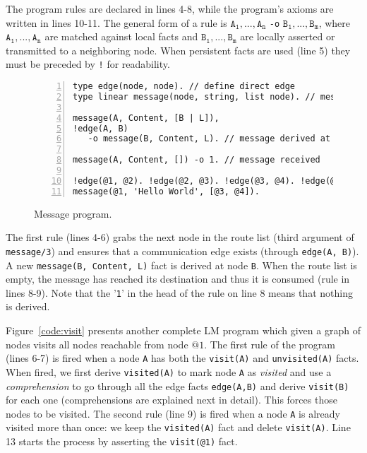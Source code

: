The program rules are declared in lines 4-8, while the program's axioms are written in lines 10-11.
The general form of a rule is $\mathtt{A_1},...,\mathtt{A_n}$ \texttt{-o} $\mathtt{B_1},...,\mathtt{B_m}$, where $\mathtt{A_1},...,\mathtt{A_n}$ are matched against local facts and $\mathtt{B_1},...,\mathtt{B_m}$ are locally asserted or transmitted to a neighboring node.
When persistent facts are used (line 5) they must be
preceded by \texttt{!} for readability.

{\scriptsize
\begin{figure}[h!]
\begin{Verbatim}[numbers=left]
type edge(node, node). // define direct edge
type linear message(node, string, list node). // message format

message(A, Content, [B | L]),
!edge(A, B)
   -o message(B, Content, L). // message derived at node B

message(A, Content, []) -o 1. // message received

!edge(@1, @2). !edge(@2, @3). !edge(@3, @4). !edge(@1, @3).
message(@1, 'Hello World', [@3, @4]).
\end{Verbatim}
\caption{Message program.}
  \label{code:message}
\end{figure}
}

The first rule (lines 4-6) grabs the next node in the route list (third argument of \texttt{message/3}) and
ensures that a communication edge exists (through \texttt{edge(A, B)}).
A new \texttt{message(B,~Content,~L)} fact is derived at node \texttt{B}.
When the route list is empty, the message has reached its destination and thus it is consumed
(rule in lines 8-9). Note that the '\texttt{1}' in the head of the rule on line 8 means that nothing is derived.

Figure~\ref{code:visit} presents another complete LM program which given a graph
of nodes visits all nodes reachable from node $@1$.
The first rule of the program (lines 6-7) is fired when a node \texttt{A} has both the \texttt{visit(A)} and \texttt{unvisited(A)} facts.
When fired, we first derive \texttt{visited(A)} to mark node \texttt{A} as \textit{visited} and use a
\emph{comprehension} to go through all the edge facts \texttt{edge(A,B)} and derive \texttt{visit(B)} for each
one (comprehensions are explained next in detail). This forces those nodes to be visited.
The second rule (line 9) is fired when a
node \texttt{A} is already visited more than once: we keep the \texttt{visited(A)} fact and delete \texttt{visit(A)}.
Line 13 starts the process by asserting the \texttt{visit(@1)} fact.

